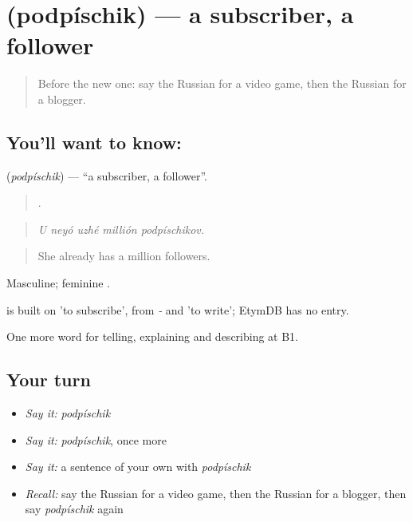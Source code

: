 \section[\texorpdfstring{\ru{подписчик} (podpíschik)}{подписчик (podpíschik)}]{ (podpíschik) — a subscriber, a follower}

\label{lesson:RU-C528-podpischik}



\begin{quote}
Before the new one: say the Russian for a video game, then the Russian for a blogger.
\end{quote}

\subsection*{You'll want to know: }
\textbf{} (\emph{podpíschik}) — \textquotedblleft{}a subscriber, a follower\textquotedblright{}.

\begin{quote}
    .
\end{quote}

\begin{quote}
\emph{U neyó uzhé millión podpíschikov.}
\end{quote}

\begin{quote}
She already has a million followers.
\end{quote}

Masculine; feminine .

\begin{cousinweb}
\emph{} is built on \emph{} 'to subscribe', from \emph{-} and \emph{} 'to write'; EtymDB has no entry.
\end{cousinweb}

\begin{grammarlens}[title={What you've built}]
One more word for telling, explaining and describing at B1.
\end{grammarlens}

\subsection*{Your turn}
\begin{itemize}
\raggedright
  \item \emph{Say it:} \emph{podpíschik}
  \item \emph{Say it:} \emph{podpíschik}, once more
  \item \emph{Say it:} a sentence of your own with \emph{podpíschik}
  \item \emph{Recall:} say the Russian for a video game, then the Russian for a blogger, then say \emph{podpíschik} again
\end{itemize}

